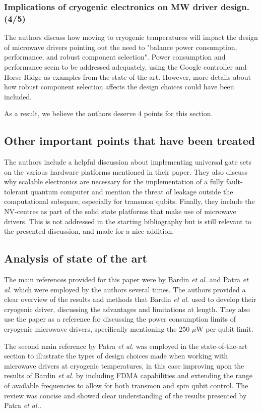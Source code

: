 \documentclass[11pt]{article}
\begin{document}
\subsubsection{Implications of cryogenic electronics on MW driver design. (4/5)}

The authors discuss how moving to cryogenic temperatures will impact the design
of microwave drivers pointing out the need to "balance power consumption,
performance, and robust component selection". Power consumption and performance
seem to be addressed adequately, using the Google controller and Horse Ridge as
examples from the state of the art. However, more details about how robust
component selection affects the design choices could have been included.

As a result, we believe the authors deserve 4 points for this section.

\subsection{Other important points that have been treated}

The authors include a helpful discussion about implementing universal gate sets
on the various hardware platforms mentioned in their paper. They also discuss
why scalable electronics are necessary for the implementation of a fully
fault-tolerant quantum computer and mention the threat of leakage outside the
computational subspace, especially for transmon qubits. Finally, they include
the NV-centres as part of the solid state platforms that make use of microwave
drivers. This is not addressed in the starting bibliography but is still
relevant to the presented discussion, and made for a nice addition.

\subsection{Analysis of state of the art}

The main references provided for this paper were by Bardin \emph{et al.} and
Patra \emph{et al.} which were employed by the authors several times. The
authors provided a clear overview of the results and methods that Bardin
\emph{et al.} used to develop their cryogenic driver, discussing the advantages
and limitations at length. They also use the paper as a reference for discussing
the power consumption limits of cryogenic microwave drivers, specifically
mentioning the 250 $ \mu $W per qubit limit.

The second main reference by Patra \emph{et al.} was employed in the
state-of-the-art section to illustrate the types of design choices made when
working with microwave drivers at cryogenic temperatures, in this case improving
upon the results of Bardin \emph{et al.} by including FDMA capabilities and
extending the range of available frequencies to allow for both transmon and spin
qubit control. The review was concise and showed clear understanding of the
results presented by Patra \emph{et al.}.
\end{document}
